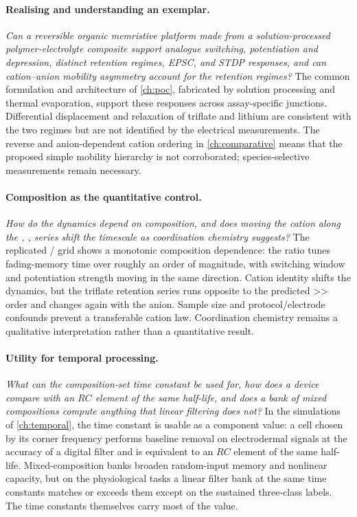 \documentclass[12pt, twoside]{report}
\begin{document}
\paragraph{Realising and understanding an exemplar.} \emph{Can a reversible \twoterminal{} organic memristive platform made from a solution-processed polymer-electrolyte composite support analogue switching, potentiation and depression, distinct retention regimes, EPSC, and STDP responses, and can cation--anion mobility asymmetry account for the retention regimes?} The common formulation and architecture of \cref{ch:poc}, fabricated by solution processing and thermal evaporation, support these responses across assay-specific junctions. Differential displacement and relaxation of triflate and lithium are consistent with the two regimes but are not identified by the electrical measurements. The reverse and anion-dependent cation ordering in \cref{ch:comparative} means that the proposed simple mobility hierarchy is not corroborated; species-selective measurements remain necessary.

\paragraph{Composition as the quantitative control.} \emph{How do the dynamics depend on composition, and does moving the cation along the , ,  series shift the timescale as coordination chemistry suggests?} The replicated \PEO{}/\LiTf{} grid shows a monotonic composition dependence: the ratio tunes fading-memory time over roughly an order of magnitude, with switching window and potentiation strength moving in the same direction. Cation identity shifts the dynamics, but the triflate retention series runs opposite to the predicted >> order and changes again with the anion. Sample size and protocol/electrode confounds prevent a transferable cation law. Coordination chemistry remains a qualitative interpretation rather than a quantitative result.

\paragraph{Utility for temporal processing.} \emph{What can the composition-set time constant be used for, how does a device compare with an $RC$ element of the same half-life, and does a bank of mixed compositions compute anything that linear filtering does not?} In the simulations of \cref{ch:temporal}, the time constant is usable as a component value: a cell chosen by its corner frequency performs baseline removal on electrodermal signals at the accuracy of a digital filter and is equivalent to an $RC$ element of the same half-life. Mixed-composition banks broaden random-input memory and nonlinear capacity, but on the physiological tasks a linear filter bank at the same time constants matches or exceeds them except on the sustained three-class labels. The time constants themselves carry most of the value.
\end{document}
